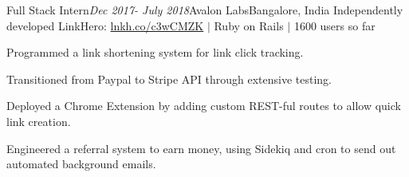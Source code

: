 \begin{rSubsection}{Full Stack Intern}{\em Dec 2017- July 2018}{Avalon Labs}{Bangalore, India}
    Independently developed LinkHero: \href{http://lnkh.co/c3wCMZK}{lnkh.co/c3wCMZK} $\vert$ Ruby on Rails $\vert$ 1600 users so far
    \item
    Programmed a link shortening system for link click tracking.
    \item 
    Transitioned from Paypal to Stripe API through extensive testing.
    \item
    Deployed a Chrome Extension by adding custom REST-ful routes to allow quick link creation.
    \item Engineered a referral system to earn money, using Sidekiq and cron to send out automated background emails.
\end{rSubsection}